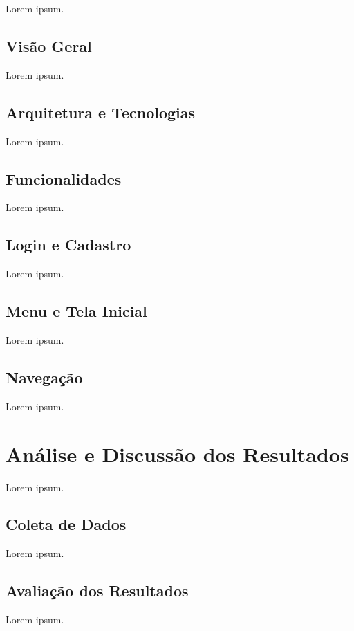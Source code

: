 \documentclass[english,brazilian]{UNISINOSartigo} %
\begin{document}
Lorem ipsum.

\subsection{Visão Geral}

Lorem ipsum.

\subsection{Arquitetura e Tecnologias}

Lorem ipsum.

\subsection{Funcionalidades}

Lorem ipsum.

\subsection{Login e Cadastro}

Lorem ipsum.

\subsection{Menu e Tela Inicial}

Lorem ipsum.

\subsection{Navegação}

Lorem ipsum.

\section{Análise e Discussão dos Resultados}

Lorem ipsum.

\subsection{Coleta de Dados}

Lorem ipsum.

\subsection{Avaliação dos Resultados}

Lorem ipsum.
\end{document}
